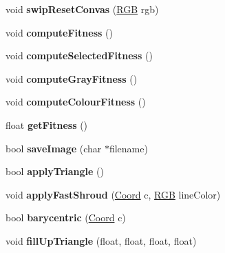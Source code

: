 \begin{DoxyCompactItemize}
\item 
\hypertarget{class_triangle_af24e0467cbc298ece82c83ab30359d13}{void {\bfseries swip\-Reset\-Convas} (\hyperlink{struct_r_g_b}{R\-G\-B} rgb)}\label{class_triangle_af24e0467cbc298ece82c83ab30359d13}

\item 
\hypertarget{class_triangle_ae3d4e6e9ab7b8145cc605909522f4ecb}{void {\bfseries compute\-Fitness} ()}\label{class_triangle_ae3d4e6e9ab7b8145cc605909522f4ecb}

\item 
\hypertarget{class_triangle_a05b1f62b4b74ff95ccc8d170b5379c9a}{void {\bfseries compute\-Selected\-Fitness} ()}\label{class_triangle_a05b1f62b4b74ff95ccc8d170b5379c9a}

\item 
\hypertarget{class_triangle_a54020e19072de8f07675395b806a82f0}{void {\bfseries compute\-Gray\-Fitness} ()}\label{class_triangle_a54020e19072de8f07675395b806a82f0}

\item 
\hypertarget{class_triangle_a5b4400a2d8f7d2951ac1cc1de41c55bf}{void {\bfseries compute\-Colour\-Fitness} ()}\label{class_triangle_a5b4400a2d8f7d2951ac1cc1de41c55bf}

\item 
\hypertarget{class_triangle_a15d952aa3e44244b734842119fba0fea}{float {\bfseries get\-Fitness} ()}\label{class_triangle_a15d952aa3e44244b734842119fba0fea}

\item 
\hypertarget{class_triangle_a3db7acfcac6a6b7fa92614158c13c0d0}{bool {\bfseries save\-Image} (char $\ast$filename)}\label{class_triangle_a3db7acfcac6a6b7fa92614158c13c0d0}

\item 
\hypertarget{class_triangle_a2dd8a94b9f7803557c395a8f1fd8db77}{bool {\bfseries apply\-Triangle} ()}\label{class_triangle_a2dd8a94b9f7803557c395a8f1fd8db77}

\item 
\hypertarget{class_triangle_aad652cfc36d71b52ce5b7211f9e2364c}{void {\bfseries apply\-Fast\-Shroud} (\hyperlink{struct_coord}{Coord} c, \hyperlink{struct_r_g_b}{R\-G\-B} line\-Color)}\label{class_triangle_aad652cfc36d71b52ce5b7211f9e2364c}

\item 
\hypertarget{class_triangle_afb1ed6bca05869c9c87d8ae28893a35e}{bool {\bfseries barycentric} (\hyperlink{struct_coord}{Coord} c)}\label{class_triangle_afb1ed6bca05869c9c87d8ae28893a35e}

\item 
\hypertarget{class_triangle_a4b3815b250c86f315fe6291e2a232bb6}{void {\bfseries fill\-Up\-Triangle} (float, float, float, float)}\label{class_triangle_a4b3815b250c86f315fe6291e2a232bb6}

\end{DoxyCompactItemize}
